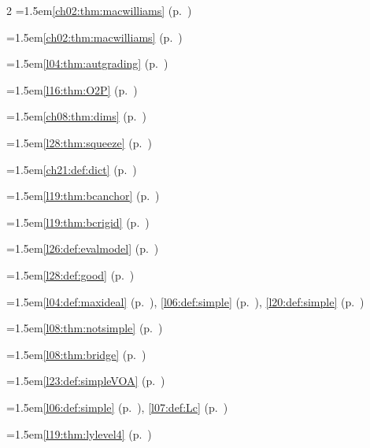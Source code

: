 \begin{multicols}{2}
\hangindent=1.5em\quad \ref{ch02:thm:macwilliams} (p.~\pageref{ch02:thm:macwilliams})\par
\hangindent=1.5em\quad \ref{ch02:thm:macwilliams} (p.~\pageref{ch02:thm:macwilliams})\par
\hangindent=1.5em\quad \ref{l04:thm:autgrading} (p.~\pageref{l04:thm:autgrading})\par
\hangindent=1.5em\quad \ref{l16:thm:O2P} (p.~\pageref{l16:thm:O2P})\par
\hangindent=1.5em\quad \ref{ch08:thm:dims} (p.~\pageref{ch08:thm:dims})\par
\hangindent=1.5em\quad \ref{l28:thm:squeeze} (p.~\pageref{l28:thm:squeeze})\par
\hangindent=1.5em\quad \ref{ch21:def:dict} (p.~\pageref{ch21:def:dict})\par
\hangindent=1.5em\quad \ref{l19:thm:bcanchor} (p.~\pageref{l19:thm:bcanchor})\par
\hangindent=1.5em\quad \ref{l19:thm:bcrigid} (p.~\pageref{l19:thm:bcrigid})\par
\hangindent=1.5em\quad \ref{l26:def:evalmodel} (p.~\pageref{l26:def:evalmodel})\par
\hangindent=1.5em\quad \ref{l28:def:good} (p.~\pageref{l28:def:good})\par
\hangindent=1.5em\quad \ref{l04:def:maxideal} (p.~\pageref{l04:def:maxideal}), \ref{l06:def:simple} (p.~\pageref{l06:def:simple}), \ref{l20:def:simple} (p.~\pageref{l20:def:simple})\par
\hangindent=1.5em\quad \ref{l08:thm:notsimple} (p.~\pageref{l08:thm:notsimple})\par
\hangindent=1.5em\quad \ref{l08:thm:bridge} (p.~\pageref{l08:thm:bridge})\par
\hangindent=1.5em\quad \ref{l23:def:simpleVOA} (p.~\pageref{l23:def:simpleVOA})\par
\hangindent=1.5em\quad \ref{l06:def:simple} (p.~\pageref{l06:def:simple}), \ref{l07:def:Lc} (p.~\pageref{l07:def:Lc})\par
\hangindent=1.5em\quad \ref{l19:thm:lylevel4} (p.~\pageref{l19:thm:lylevel4})\par

\end{multicols}
